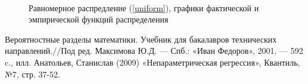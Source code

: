 \documentclass[12pt,a4paper]{article}
\begin{document}
{\begin{figure}[htptp]
\begin{minipage}[h]{0.3\linewidth}
						\\
					\end{minipage}
					\caption{Равномерное распредление (\ref{uniform}), графики фактической и эмпирической функций распределения}
					\label{ris:uniform_cum}
				\end{figure}
			}
			\clearpage
			\newpage
	
	\begin{thebibliography}{1}
		  Вероятностные разделы математики. Учебник для бакалавров технических направлений.//Под ред. Максимова Ю.Д. — Спб.: «Иван Федоров»,
		2001. — 592 c., илл.
		 Анатольев, Станислав (2009) «Непараметрическая регрессия», Квантиль, №7, стр. 37-52.
	\end{thebibliography}
\end{document}
